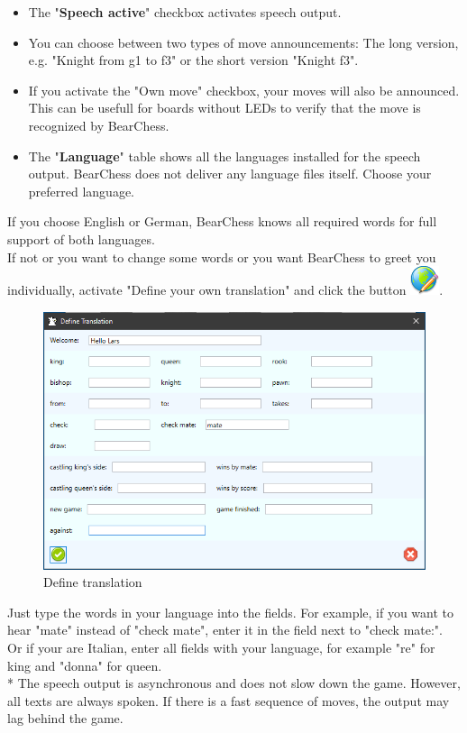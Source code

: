 \documentclass[11pt,a4paper]{article}
\begin{document}
	\begin{itemize}
		\item The "\textbf{Speech active}" checkbox activates speech output.
		\item You can choose between two types of move announcements: The long version, e.g. "Knight from g1 to f3" or the short version "Knight f3".
		\item If you activate the "Own move" checkbox, your moves will also be announced. This can be usefull for boards without LEDs to verify that the move is recognized by BearChess.
		\item The "\textbf{Language}" table shows all the languages installed for the speech output. BearChess does not deliver any language files itself. Choose your preferred language. 
	\end{itemize}
	If you choose English or German, BearChess knows all required words for full support of both languages.\\
	If not or you want to change some words or you want BearChess to greet you individually, activate "Define your own translation" and click the button \includegraphics[scale=0.5]{world_edit.png}.
	
	\begin{figure}[H]
		\centering
		\includegraphics[scale=0.7]{Sounds3.png}
		\caption{Define translation}
		\label{fig:Sounds3}
	\end{figure}
	Just type the words in your language into the fields. For example, if you want to hear "mate" instead of "check mate", enter it in the field next to "check mate:".\\
	Or if your are Italian, enter all fields with your language, for example "re" for king and "donna" for queen.\\
	{\color{red}*} The speech output is asynchronous and does not slow down the game. However, all texts are always spoken. If there is a fast sequence of moves, the output may lag behind the game.
	
\end{document}
